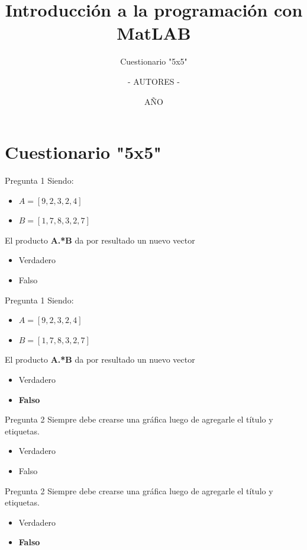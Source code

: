 \documentclass{bredelebeamer}
\title[Programación en MatLAB]{Introducción a la programación con MatLAB}
\subtitle{Cuestionario "5x5"}
\author{- AUTORES - \inst{1}}
\institute[UNIVERSIDAD]
{
  \inst{1}%
  - NOMBRE UNIVERSIDAD - 
  }
\date{AÑO}
\begin{document}
\begin{frame}
  \titlepage 
\end{frame}




\section{Cuestionario "5x5"}

\begin{frame}{Pregunta 1}
Siendo:
\begin{itemize}
\item $A = [9, 2, 3, 2, 4]$
\item $B = [1, 7, 8, 3, 2,7]$
\end{itemize}
El producto \textbf{A.*B} da por resultado un nuevo vector
\begin{itemize}
\item Verdadero
\item Falso
\end{itemize}
\end{frame}

\begin{frame}{Pregunta 1}
Siendo:
\begin{itemize}
\item $A = [9, 2, 3, 2, 4]$
\item $B = [1, 7, 8, 3, 2,7]$
\end{itemize}
El producto \textbf{A.*B} da por resultado un nuevo vector
\begin{itemize}
\item Verdadero
\item \textbf{Falso}
\end{itemize}
\end{frame}

\begin{frame}{Pregunta 2}
Siempre debe crearse una gráfica luego de agregarle el título y etiquetas. 
\begin{itemize}
\item Verdadero
\item Falso
\end{itemize}
\end{frame}

\begin{frame}{Pregunta 2}
Siempre debe crearse una gráfica luego de agregarle el título y etiquetas. 
\begin{itemize}
\item Verdadero
\item \textbf{Falso}
\end{itemize}
\end{frame}
\end{document}
